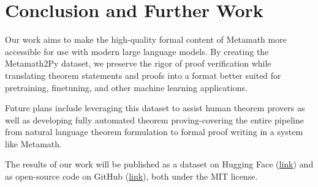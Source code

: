 \section{Conclusion and Further Work}
\hspace{\parindent}
Our work aims to make the high-quality formal content of Metamath more accessible for use with modern large language models. By creating the Metamath2Py dataset, we preserve the rigor of proof verification while translating theorem statements and proofs into a format better suited for pretraining, finetuning, and other machine learning applications.

Future plans include leveraging this dataset to assist human theorem provers as well as  
developing fully automated theorem proving-covering the entire pipeline from natural language theorem
formulation to formal proof writing in a system like Metamath.  

The results of our work will be published as a dataset on Hugging Face (\href{https://huggingface.co/datasets/kamushekp/Metamath2Py}{link}) and as open-source code on GitHub (\href{https://github.com/kamushekp/metamath2py}{link}), both
under the MIT license.
